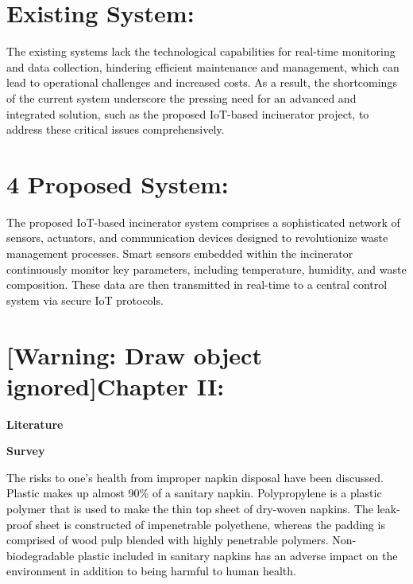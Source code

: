\documentclass[letterpaper]{article}
\begin{document}
\bigskip

\section[Existing System:]{Existing System:}
\textcolor{black}{The existing systems lack the technological capabilities for real-time monitoring and data collection,
hindering efficient maintenance and management, which can lead to operational challenges and increased costs. As a
result, the shortcomings of the current system underscore the pressing need for an advanced and integrated solution,
such as the proposed IoT-based incinerator project, to address these critical issues comprehensively.}


\bigskip


\bigskip

\section[4 Proposed System:]{4 Proposed System:}
\textcolor{black}{The proposed IoT-based incinerator system comprises a sophisticated network of sensors, actuators, and
communication devices designed to revolutionize waste management processes. Smart sensors embedded within the
incinerator continuously monitor key parameters, including temperature, humidity, and waste composition. These data are
then transmitted in real-time to a central control system via secure IoT protocols.}

\clearpage\setcounter{page}{1}\pagestyle{Convertedix}
\section[Chapter II:]{[Warning: Draw object ignored]Chapter II:}
{\centering
\textbf{Literature}
\par}

{\centering
\textbf{Survey}
\par}


\bigskip


\bigskip

\textcolor{black}{The risks to one's health from improper napkin disposal have been discussed. Plastic makes up almost
90\% of a sanitary napkin. Polypropylene is a plastic polymer that is used to make the thin top sheet of dry-woven
napkins. The leak-proof sheet is constructed of impenetrable polyethene, whereas the padding is comprised of wood pulp
blended with highly penetrable polymers. Non-biodegradable plastic included in sanitary napkins has an adverse impact
on the environment in addition to being harmful to human health.}
\end{document}
